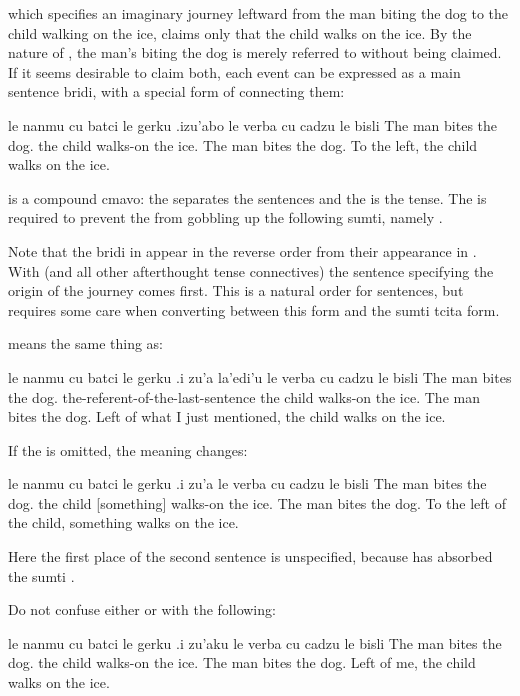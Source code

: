 {\noindent}which specifies an imaginary journey leftward from the man
    biting the dog to the child walking on the ice, claims only
    that the child walks on the ice. By the nature of ,
    the man's biting the dog is merely referred to without being
    claimed. If it seems desirable to claim both, each event can be
    expressed as a main sentence bridi, with a special form of
     connecting them:
\begin{example}
le nanmu cu batci le gerku\n
\T	.izu'abo le verba cu cadzu le bisli\n
The man bites the dog.\n
\T	{} the child walks-on the ice.\n
The  man bites the dog.  To the left, the child\n
\T	walks on the ice.
\end{example}

 is a compound cmavo: the  separates the
    sentences and the  is the tense. The  is required
    to prevent the  from gobbling up the following sumti,
    namely . 

Note that the bridi in 
    appear in the reverse order from their appearance in . With  (and all
    other afterthought tense connectives) the sentence specifying
    the origin of the journey comes first. This is a natural order
    for sentences, but requires some care when converting between
    this form and the sumti tcita form.

 means the same thing
    as:
\begin{example}
le nanmu cu batci le gerku\n
\T	.i zu'a la'edi'u\n
\T	le verba cu cadzu le bisli\n
The man bites the dog.\n
\T	{} the-referent-of-the-last-sentence\n
\T	the child walks-on the ice.\n
The man bites the dog.\n
\T	Left of what I just mentioned,\n
\T	the child walks on the ice.
\end{example}

If the  is omitted, the meaning changes:
\begin{example}
le nanmu cu batci le gerku\n
\T	.i zu'a le verba cu cadzu le bisli\n
The man bites the dog.\n
\T	{} the child [something] walks-on the ice.\n
The man bites the dog. To the left of the child,\n
\T	something walks on the ice.
\end{example}

Here the first place of the second sentence is unspecified,
    because  has absorbed the sumti .

Do not confuse either  or with the following:
\begin{example}
le nanmu cu batci le gerku\n
\T	.i zu'aku le verba cu cadzu le bisli\n
The man bites the dog.\n
\T	{} the child walks-on the ice.\n
The man bites the dog.  Left of me, the child walks\n
\T	on the ice.
\end{example}

